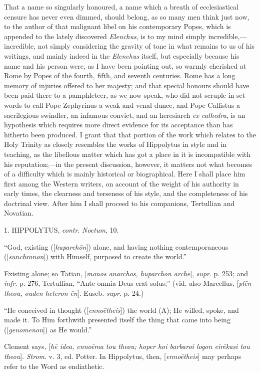 That a name so singularly honoured, a name which a breath of
ecclesiastical censure has never even dimmed, should belong, as so
many men think just now, to the author of that malignant libel on his
contemporary Popes, which is appended to the lately discovered \emph{Elenchus},
is to my mind simply incredible,—incredible, not simply considering
the gravity of tone in what remains to us of his writings, and mainly
indeed in the \emph{Elenchus} itself, but especially because his name
and his person were, as I have been pointing out, so warmly cherished
at Rome by Popes of the fourth, fifth, and seventh centuries. Rome has
a long memory of injuries offered to her majesty; and that special
honours should have been paid there to a pamphleteer, as we now speak,
who did not scruple in set words to call Pope Zephyrinus a weak and
venal dunce, and Pope Callistus a sacrilegious swindler, an infamous
convict, and an heresiarch \emph{ex cathedra}, is an hypothesis which
requires more direct evidence for its acceptance than has hitherto
been produced. I grant that that portion of the work which relates to
the Holy Trinity as closely resembles the works of Hippolytus in style
and in teaching, as the libellous matter which has got a place in it
is incompatible with his reputation;—in the present
discussion, however, it matters not what becomes of a difficulty which
is mainly historical or biographical. Here I shall place him first
among the Western writers, on account of the weight of his authority
in early times, the clearness and terseness of his style, and the
completeness of his doctrinal view. After him I shall proceed to his
companions, Tertullian and Novatian.

1. HIPPOLYTUS, \emph{contr}. \emph{Noetum},
10.

``God, existing ([\emph{huparch\={o}n}]) alone, and having
nothing contemporaneous ([\emph{sunchronon}]) with Himself, purposed
to create the world.''

Existing alone; so Tatian, [\emph{monos anarchos, huparch\={o}n
arch\={e}}], \emph{supr}. p. 253; and \emph{infr}. p. 276,
Tertullian, ``Ante omnia Deus erat solus;'' (vid. also
Marcellus, [\emph{pl\={e}n theou, ouden heteron \={e}n}]. Euseb.
\emph{supr}. p. 24.)

``He conceived in thought ([\emph{enno\={e}theis}]) the
world (A); He willed, spoke, and made it. To Him forthwith presented
itself the thing that came into being ([\emph{genomenon}]) as He
would.''

Clement says, [\emph{h\={e} idea, enno\={e}ma tou theou; hoper
hoi barbaroi logon eir\={e}kasi tou theou}]. \emph{Strom}. v. 3,
ed. Potter. In Hippolytus, then, [\emph{enno\={e}theis}] may
perhaps refer to the Word as endiathetic.

